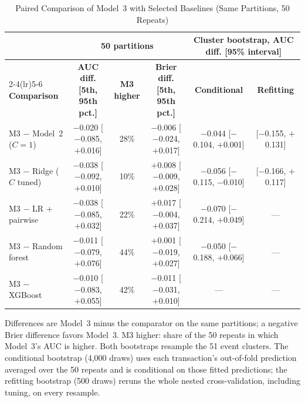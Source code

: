 \begin{table}[!t]
\caption{Paired Comparison of Model~3 with Selected Baselines (Same Partitions, 50 Repeats)}
\label{tab:paired}
\centering
\footnotesize
\begin{tabular*}{\textwidth}{@{\extracolsep{\fill}}lccccc}
\toprule
 & \multicolumn{3}{c}{\textbf{50 partitions}} & \multicolumn{2}{c}{\textbf{Cluster bootstrap, AUC diff. [95\% interval]}} \\
\cmidrule(lr){2-4}\cmidrule(lr){5-6}
\textbf{Comparison} & \textbf{AUC diff. [5th, 95th pct.]} & \textbf{M3 higher} & \textbf{Brier diff. [5th, 95th pct.]} & \textbf{Conditional} & \textbf{Refitting} \\
\midrule
M3 $-$ Model~2 ($C=1$) & $-$0.020 [$-$0.085, $+$0.016] & 28\% & $-$0.006 [$-$0.024, $+$0.017] & $-$0.044 [$-$0.104, $+$0.001] & [$-$0.155, $+$0.131] \\
M3 $-$ Ridge ($C$ tuned) & $-$0.038 [$-$0.092, $+$0.010] & 10\% & $+$0.008 [$-$0.009, $+$0.028] & $-$0.056 [$-$0.115, $-$0.010] & [$-$0.166, $+$0.117] \\
M3 $-$ LR + pairwise & $-$0.038 [$-$0.085, $+$0.032] & 22\% & $+$0.017 [$-$0.004, $+$0.037] & $-$0.070 [$-$0.214, $+$0.049] & --- \\
M3 $-$ Random forest & $-$0.011 [$-$0.079, $+$0.076] & 44\% & $+$0.001 [$-$0.019, $+$0.027] & $-$0.050 [$-$0.188, $+$0.066] & --- \\
M3 $-$ XGBoost & $-$0.010 [$-$0.083, $+$0.055] & 42\% & $-$0.011 [$-$0.031, $+$0.010] & --- & --- \\
\bottomrule
\end{tabular*}
\par\vspace{2pt}\parbox{0.96\textwidth}{\scriptsize Differences are Model~3 minus the comparator on the same partitions; a negative Brier
difference favors Model~3. M3 higher: share of the 50 repeats in which Model~3's AUC is higher. Both bootstraps resample the 51 event
clusters. The conditional bootstrap (4,000 draws) uses each transaction's out-of-fold prediction averaged over the 50 repeats and
is conditional on those fitted predictions; the refitting bootstrap (500 draws) reruns the whole nested
cross-validation, including tuning, on every resample.}
\end{table}
